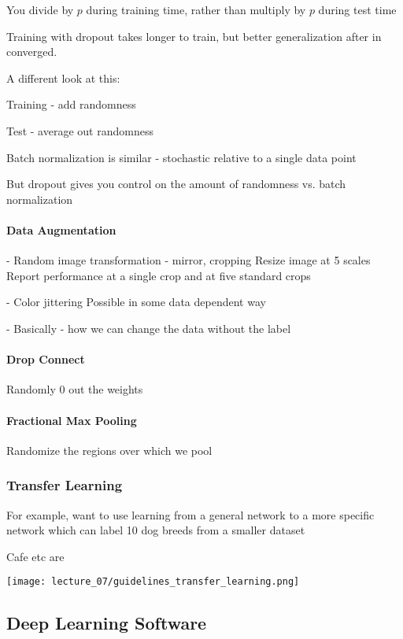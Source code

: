You divide by $p$ during training time, rather than multiply by $p$ during test time

Training with dropout takes longer to train, but better generalization after in converged.

A different look at this: 

Training - add randomness

Test - average out randomness

Batch normalization is similar - stochastic relative to a single data point

But dropout gives you control on the amount of randomness vs. batch normalization

\paragraph{Data Augmentation}

- Random image transformation - mirror, cropping
  Resize image at 5 scales
  Report performance at a single crop and at five standard crops

- Color jittering
  Possible in some data dependent way

- Basically - how we can change the data without the label

\paragraph{Drop Connect}

Randomly 0 out the weights

\paragraph{Fractional Max Pooling}

Randomize the regions over which we pool

\subsubsection{Transfer Learning}

For example, want to use learning from a general network to a more specific network which can label 10 dog breeds from a smaller dataset

Cafe etc are 

\texttt{[image: lecture\_07/guidelines\_transfer\_learning.png]}

\subsection{Deep Learning Software}

